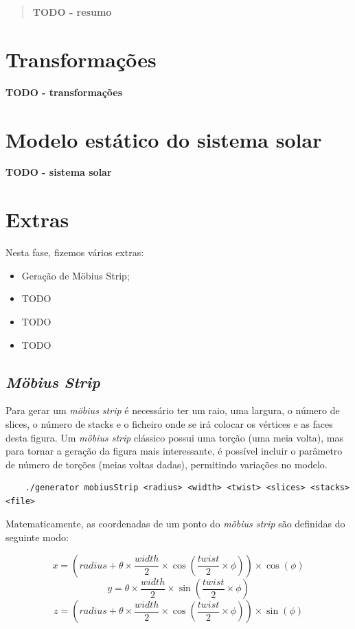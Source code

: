 \documentclass[12pt, a4paper]{article}
\begin{document}
\pagebreak

\begin{abstract}
    \textbf{\color{red} TODO - resumo}
\end{abstract}

\section{Transformações}

\textbf{\color{red} TODO - transformações}

\section{Modelo estático do sistema solar}

\textbf{\color{red} TODO - sistema solar}

\section{Extras}

Nesta fase, fizemos vários extras:
\begin{itemize}
    \item Geração de Möbius Strip;
    \item \color{red} TODO
    \item \color{red} TODO
    \item \color{red} TODO
\end{itemize}
\subsection{\emph{Möbius Strip}}

Para gerar um \emph{möbius strip} é necessário ter um raio, uma largura, o número de slices,
o número de stacks e o ficheiro onde se irá colocar os vértices e as faces desta figura.
Um \emph{möbius strip} clássico possui uma torção (uma meia volta), mas para tornar a geração
da figura mais interessante, é possível incluir o parâmetro de número de torções (meias voltas
dadas), permitindo variações no modelo.
\begin{verbatim}
    ./generator mobiusStrip <radius> <width> <twist> <slices> <stacks> <file>
\end{verbatim}

Matematicamente, as coordenadas de um ponto do \emph{möbius strip} são definidas do seguinte modo:

$$x = (radius + \theta \times \frac{width}{2} \times \cos (\frac{twist}{2} \times \phi)) \times
\cos (\phi)$$
$$y = \theta \times \frac{width}{2} \times \sin (\frac{twist}{2} \times \phi)$$
$$z = (radius + \theta \times \frac{width}{2} \times \cos (\frac{twist}{2} \times \phi)) \times
\sin (\phi)$$
\end{document}
